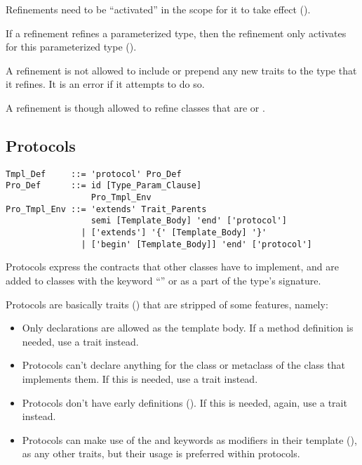 Refinements need to be ``activated'' in the scope for it to take effect ().

If a refinement refines a parameterized type, then the refinement only activates for this parameterized type (). 

A refinement is not allowed to include or prepend any new traits to the type that it refines. It is an error if it attempts to do so. 

A refinement is though allowed to refine classes that are  or . 






\subsection{Protocols}
\label{sec:protocols}

\syntax\begin{lstlisting}
Tmpl_Def     ::= 'protocol' Pro_Def
Pro_Def      ::= id [Type_Param_Clause]
                 Pro_Tmpl_Env
Pro_Tmpl_Env ::= 'extends' Trait_Parents
                 semi [Template_Body] 'end' ['protocol']
               | ['extends'] '{' [Template_Body] '}'
               | ['begin' [Template_Body]] 'end' ['protocol']
\end{lstlisting}

Protocols express the contracts that other classes have to implement, and are added to classes with the keyword ``'' or as a part of the type's signature. 

Protocols are basically traits () that are stripped of some features, namely: 
\begin{itemize}
\item
Only declarations are allowed as the template body. If a method definition is needed, use a trait instead. 

\item
Protocols can't declare anything for the class or metaclass of the class that implements them. If this is needed, use a trait instead. 

\item
Protocols don't have early definitions (). If this is needed, again, use a trait instead. 

\item 
Protocols can make use of the  and  keywords as modifiers in their template (), as any other traits, but their usage is preferred within protocols. 
\end{itemize}


